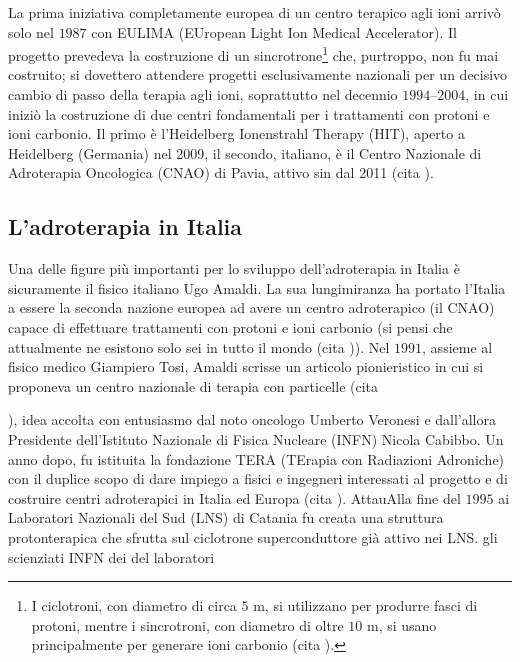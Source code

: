 \documentclass[12pt,a4paper,twoside]{report}
\begin{document}
	La prima iniziativa completamente europea di un centro terapico agli ioni arrivò solo nel $1987$ con EULIMA (EUropean Light Ion Medical Accelerator). Il progetto prevedeva la costruzione di un sincrotrone\footnote{I ciclotroni, con diametro di circa $5\mbox{ m}$, si utilizzano per produrre fasci di protoni, mentre i sincrotroni, con diametro di oltre $10\mbox{ m}$, si usano principalmente per generare ioni carbonio (cita
	).} che, purtroppo, non fu mai costruito; si dovettero attendere progetti esclusivamente nazionali per un decisivo cambio di passo della terapia agli ioni, soprattutto nel decennio $1994$--$2004$, in cui iniziò la costruzione di due centri fondamentali per i trattamenti con protoni e ioni carbonio. Il primo è l'Heidelberg Ionenstrahl Therapy (HIT), aperto a Heidelberg (Germania) nel 2009, il secondo, italiano, è il Centro Nazionale di Adroterapia Oncologica (CNAO) di Pavia, attivo sin dal 2011 (cita
	).
	
	\subsection{L'adroterapia in Italia}
	Una delle figure più importanti per lo sviluppo dell'adroterapia in Italia è sicuramente il fisico italiano Ugo Amaldi. La sua lungimiranza ha portato l'Italia a essere la seconda nazione europea ad avere un centro adroterapico (il CNAO) capace di effettuare trattamenti con protoni e ioni carbonio (si pensi che attualmente ne esistono solo sei in tutto il mondo (cita
	)). Nel $1991$, assieme al fisico medico Giampiero Tosi, Amaldi scrisse un articolo pionieristico in cui si proponeva un centro nazionale di terapia con particelle (cita
	
	), idea accolta con entusiasmo dal noto oncologo Umberto Veronesi e dall'allora Presidente dell'Istituto Nazionale di Fisica Nucleare (INFN) Nicola Cabibbo. Un anno dopo, fu istituita la fondazione TERA (TErapia con Radiazioni Adroniche) con il duplice scopo di dare impiego a fisici e ingegneri interessati al progetto e di costruire centri adroterapici in Italia ed Europa (cita
	). AttauAlla fine del $1995$ ai Laboratori Nazionali del Sud (LNS) di Catania fu creata una struttura protonterapica che sfrutta sul ciclotrone superconduttore già attivo nei LNS. gli scienziati INFN dei del laboratori
	
\end{document}
